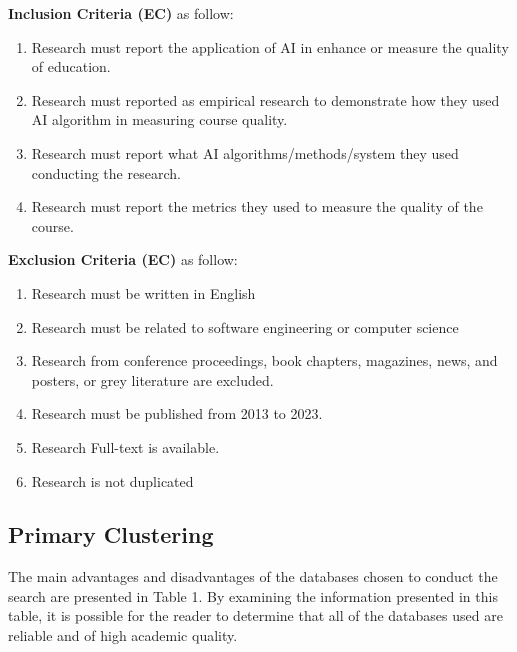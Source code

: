 \documentclass{svproc}
\begin{document}
\textbf{Inclusion Criteria (EC)} as follow: 
\begin{enumerate}

\item [IC1-] Research must report the application of AI in enhance or measure the quality of education. 
\item [IC2-] Research must reported as empirical research to demonstrate how they used AI algorithm in measuring course quality.
\item [IC3-] Research must report what AI algorithms/methods/system they used conducting the research.
\item [IC4-] Research must report the metrics they used to measure the quality of the course.

\end{enumerate}
\textbf{Exclusion Criteria (EC)} as follow: 
\begin{enumerate} 
\item [EC1-] Research must be written in English 
\item [EC2-] Research must be related to software engineering or computer science 
\item [EC3-] Research from conference proceedings, book chapters, magazines, news, and posters, or grey literature are excluded.
\item [EC4-] Research must be published from 2013 to 2023. 
\item [EC5-] Research Full-text is available.
\item [EC6-] Research is not duplicated
\end{enumerate}

\subsection{Primary Clustering}
The main advantages and disadvantages of the databases chosen to conduct the search are presented in Table 1. By examining the information presented in this table, it is possible for the reader to determine that all of the databases used are reliable and of high academic quality.
\end{document}
